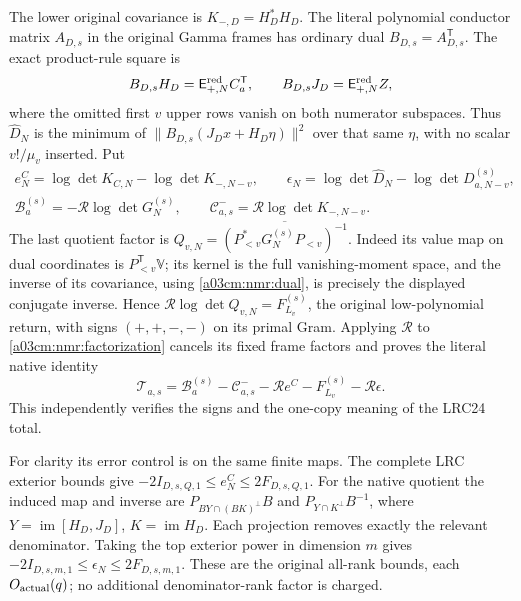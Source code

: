The lower original covariance is $K_{-,D}=H_D^*H_D$.
The literal polynomial conductor matrix $A_{D,s}$ in the original
Gamma frames has ordinary dual $B_{D,s}=A_{D,s}^{\mathsf T}$.
The exact product-rule square is
\[
B_{D,s}H_D=\mathsf E_{+,N}^{\rm red}C_a^{\mathsf T},
\qquad
B_{D,s}J_D=\mathsf E_{+,N}^{\rm red}Z,
\]
where the omitted first $v$ upper rows vanish on both numerator
subspaces. Thus $\widehat D_N$ is the minimum of
$\|B_{D,s}(J_Dx+H_D\eta)\|^2$ over that same $\eta$, with no
scalar $v!/\mu_v$ inserted.
Put
\begin{equation}\tag{NMR8}\label{a03cm:nmr:corrections}
\begin{gathered}
e_N^C=\log\det K_{C,N}-\log\det K_{-,N-v},\qquad
\epsilon_N=\log\det\widehat D_N-\log\det D_{a,N-v}^{(s)},\\
\mathcal B_a^{(s)}=-\mathcal R\log\det G_N^{(s)},\qquad
\mathcal C^-_{a,s}=\mathcal R\log\det K_{-,N-v}.
\end{gathered}
\end{equation}
The last quotient factor is
$Q_{v,N}=\overline{(P_{<v}^*G_N^{(s)}P_{<v})^{-1}}$.
Indeed its value map on dual coordinates is
$P_{<v}^{\mathsf T}\mathbb V$; its kernel is the full
vanishing-moment space, and the inverse of its covariance, using
\eqref{a03cm:nmr:dual}, is precisely the displayed conjugate inverse.
Hence
$\mathcal R\log\det Q_{v,N}=F_{L_v}^{(s)}$, the original
low-polynomial return, with signs $(+,+,-,-)$ on its primal Gram.
Applying $\mathcal R$ to \eqref{a03cm:nmr:factorization} cancels its fixed
frame factors and proves the literal native identity
\begin{equation}\tag{NMR9}\label{a03cm:nmr:total}
\mathcal T_{a,s}
=\mathcal B_a^{(s)}-\mathcal C^-_{a,s}
 -\mathcal R e^C-F_{L_v}^{(s)}-\mathcal R\epsilon .
\end{equation}
This independently verifies the signs and the one-copy meaning of
the LRC24 total.

For clarity its error control is on the same finite maps. The complete
LRC exterior bounds give
$-2I_{D,s,Q,1}\leq e_N^C\leq2F_{D,s,Q,1}$.
For the native quotient the induced map and inverse are
$P_{B Y\cap(BK)^\perp}B$ and $P_{Y\cap K^\perp}B^{-1}$,
where $Y=\operatorname{im}[H_D,J_D]$, $K=\operatorname{im}H_D$.
Each projection removes exactly the relevant denominator. Taking the
top exterior power in dimension $m$ gives
$-2I_{D,s,m,1}\leq\epsilon_N\leq2F_{D,s,m,1}$.
These are the original all-rank bounds, each $O_{\rm actual}(q)$;
no additional denominator-rank factor is charged.

